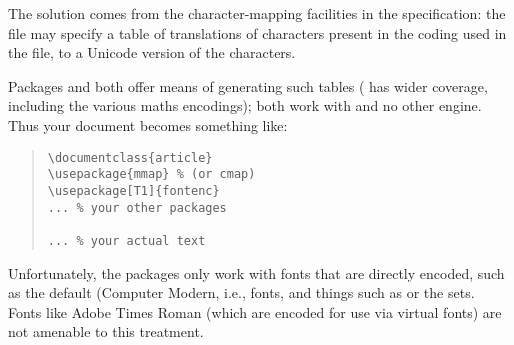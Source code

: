 The solution comes from the character-mapping facilities in the
 specification: the file may specify a table of translations
of characters present in the coding used in the file, to a Unicode
version of the characters.

Packages  and  both offer means of
generating such tables ( has wider coverage, including
the various maths encodings); both work with \pdftex{} and no other
engine.  Thus your document becomes something like:
\begin{quote}
\begin{verbatim}
\documentclass{article}
\usepackage{mmap} % (or cmap)
\usepackage[T1]{fontenc}
... % your other packages

... % your actual text
\end{verbatim}
\end{quote}

Unfortunately, the packages only work with fonts that are directly
encoded, such as the default (Computer Modern, i.e., 
fonts, and things such as  or the 
 sets.  Fonts like Adobe
Times Roman (which are encoded for \AllTeX{} use via virtual fonts)
are not amenable to this treatment.
\begin{ctanrefs}
\item[cmap.sty]
\item[cm-super \nothtml{\rmfamily}fonts]
\item[\nothtml{\rmfamily}Latin Modern fonts]
\item[mmap.sty]
\end{ctanrefs}

